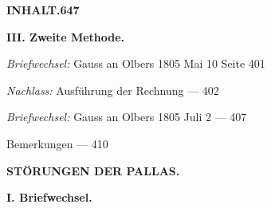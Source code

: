 \documentclass[10pt,a4paper]{article}
\newenvironment{hangparas}[2]{\setlength{\hangindent}{#1}\setlength{\hangafter}{#2}}{}
\begin{document}
\newpage

\begin{center}
\Large\textbf{INHALT.}\hfill\textbf{647}
\end{center}

\vspace{0.5em}

\begin{hangparas}{1em}{1}
\noindent\textbf{III. Zweite Methode.}

\vspace{0.2em}

\noindent\textit{Briefwechsel:} Gauss an Olbers 1805 Mai 10 \hfill Seite 401

\vspace{0.2em}

\noindent\textit{Nachlass:} Ausführung der Rechnung \hfill --- 402

\vspace{0.2em}

\noindent\textit{Briefwechsel:} Gauss an Olbers 1805 Juli 2 \hfill --- 407

\vspace{0.5em}

\noindent Bemerkungen \hfill --- 410
\end{hangparas}

\vspace{1em}

\begin{center}
\textbf{STÖRUNGEN DER PALLAS.}
\end{center}

\vspace{0.3em}

\noindent\textbf{I. Briefwechsel.}

\vspace{0.2em}
\end{document}
